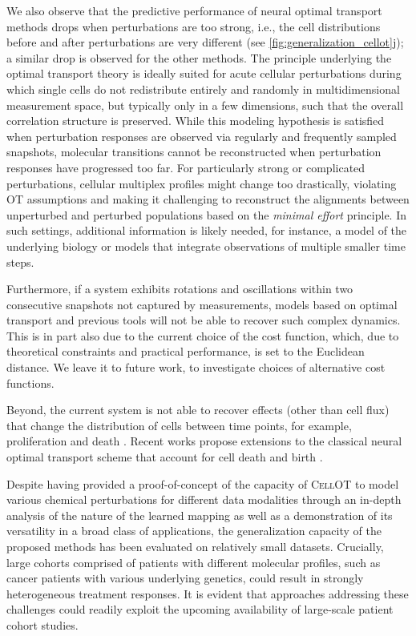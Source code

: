 We also observe that the predictive performance of neural optimal transport methods drops when perturbations are too strong, i.e., the cell distributions before and after perturbations are very different (see \cref{fig:generalization_cellot}j); a similar drop is observed for the other methods.
The principle underlying the optimal transport theory is ideally suited for acute cellular perturbations during which single cells do not redistribute entirely and randomly in multidimensional measurement space, but typically only in a few dimensions, such that the overall correlation structure is preserved. While this modeling hypothesis is satisfied when perturbation responses are observed via regularly and frequently sampled snapshots, molecular transitions cannot be reconstructed when perturbation responses have progressed too far. For particularly strong or complicated perturbations, cellular multiplex profiles might change too drastically, violating OT assumptions and making it challenging to reconstruct the alignments between unperturbed and perturbed populations based on the \emph{minimal effort} principle.
In such settings, additional information is likely needed, for instance, a model of the underlying biology or models that integrate observations of multiple smaller time steps. 

Furthermore, if a system exhibits rotations and oscillations within two consecutive snapshots not captured by measurements, models based on optimal transport and previous tools \citep{weinreb2018fundamental} will not be able to recover such complex dynamics. This is in part also due to the current choice of the cost function, which, due to theoretical constraints and practical performance, is set to the Euclidean distance. We leave it to future work, to investigate choices of alternative cost functions. 

Beyond, the current system is not able to recover effects (other than cell flux) that change the distribution of cells between time points, for example, proliferation and death \citep{tritschler2019concepts}. Recent works propose extensions to the classical neural optimal transport scheme that account for cell death and birth \citep{lubeck2022neural, pariset2023unbalanced, chen2022most, baradat2021regularized}.

Despite having provided a proof-of-concept of the capacity of \textsc{CellOT} to model various chemical perturbations for different data modalities through an in-depth analysis of the nature of the learned mapping as well as a demonstration of its versatility in a broad class of applications, the generalization capacity of the proposed methods has been evaluated on relatively small datasets. Crucially, large cohorts comprised of patients with different molecular profiles, such as cancer patients with various underlying genetics, could result in strongly heterogeneous treatment responses.
It is evident that approaches addressing these challenges could readily exploit the upcoming availability of large-scale patient cohort studies.

